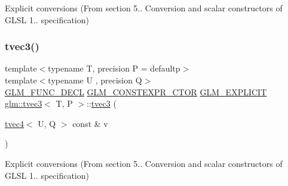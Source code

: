 Explicit conversions (From section 5.. Conversion and scalar constructors of G\+L\+SL 1.. specification) 

\mbox{\label{structglm_1_1tvec3_a63301c5a33a1fd31f0046f8c24eb6184}} 
\subsubsection{\texorpdfstring{tvec3()}{tvec3()}\hspace{0.1cm}{\footnotesize\ttfamily [13/23]}}
{\footnotesize\ttfamily template$<$typename T, precision P = defaultp$>$ \\
template$<$typename U , precision Q$>$ \\
\mbox{\hyperlink{setup_8hpp_ab2d052de21a70539923e9bcbf6e83a51}{G\+L\+M\+\_\+\+F\+U\+N\+C\+\_\+\+D\+E\+CL}} \mbox{\hyperlink{setup_8hpp_ad34178a09666081abdb573c14d1f4a5a}{G\+L\+M\+\_\+\+C\+O\+N\+S\+T\+E\+X\+P\+R\+\_\+\+C\+T\+OR}} \mbox{\hyperlink{setup_8hpp_a6c74f5a5e7b134ab69023ff9a30d4d5d}{G\+L\+M\+\_\+\+E\+X\+P\+L\+I\+C\+IT}} \mbox{\hyperlink{structglm_1_1tvec3}{glm\+::tvec3}}$<$ T, P $>$\+::\mbox{\hyperlink{structglm_1_1tvec3}{tvec3}} (\begin{DoxyParamCaption}\item[{\mbox{\hyperlink{structglm_1_1tvec4}{tvec4}}$<$ U, Q $>$ const \&}]{v }\end{DoxyParamCaption})}



Explicit conversions (From section 5.. Conversion and scalar constructors of G\+L\+SL 1.. specification) 

\mbox{\label{structglm_1_1tvec3_a8e402385548b575f903d25fbefede459}} 
